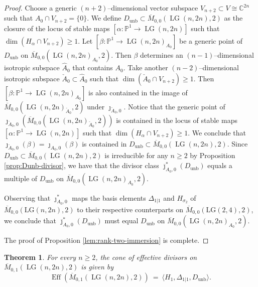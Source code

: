 \documentclass[10pt]{amsart}
\newtheorem{theorem}{Theorem}[section]
\theoremstyle{definition}
\newcommand{\Mbar}{\overline{M}}
\newcommand{\LG}{\operatorname{LG}}
\DeclareMathOperator{\unb}{unb}
\newcommand{\PP}{\mathbb{P}}
\theoremstyle{plain} %
\begin{document}
\begin{proof}
Choose a generic $(n+2)$--dimensional vector subspace $V_{n+2}\subset V\cong\mathbb C^{2n}$ such that $A_0\cap V_{n+2}=\{0\}$. We define \(D_{\mathrm{unb}} \subset \Mbar_{0,0}(\LG(n,2n),2)\) as the closure of the locus of stable maps \([\alpha \colon \PP^1 \to \LG(n,2n)]\) such that \(\dim(H_\alpha\cap V_{n+2})\geq1\). Let $[\beta \colon \PP^1 \to \LG(n,2n)_{A_0}]$ be a generic point of $D_{\unb}$ on $\overline{M}_{0,0}(\LG(n,2n)_{A_0},2)$. Then $\beta$ determines an $(n-1)$--dimensional  isotropic subspace $\widehat A_0$ that contains $A_0$. Take another $(n-2)$--dimensional  isotropic subspace $\check A_0\subset \widehat A_0$ such that $\dim (\check A_0\cap V_{n+2})\geq 1$. Then $[\beta \colon \PP^1 \to \LG(n,2n)_{A_0}]$ is also contained in the image of $\overline{M}_{0,0}(\LG(n,2n)_{\check A_0},2)$ under $\jmath_{\check A_0,0}$. Notice that the generic point of
$\jmath_{\check A_0,0}(\overline{M}_{0,0}(\LG(n,2n)_{\check A_0},2))$ is contained in the locus of stable maps \([\alpha \colon \PP^1 \to \LG(n,2n)]\) such that \(\dim(H_\alpha\cap V_{n+2})\geq1\). We conclude that $\jmath_{\check A_0,0}(\beta)=\jmath_{A_0,0}(\beta)$ is contained in \(D_{\mathrm{unb}} \subset \Mbar_{0,0}(\LG(n,2n),2)\). Since \(D_{\unb}\subset \overline{M}_{0,0}(\LG(n,2n),2)\) is irreducible for any $n\geq2$ by Proposition \ref{prop:Dunb-divisor}, we have that the divisor class
$\overline\jmath_{A_0,0}^*(D_{\unb})$ equals a multiple of $D_{\unb}$ on $\overline{M}_{0,0}(\LG(n,2n)_{A_0},2)$.

Observing that $\jmath_{A_0,0}^*$ maps the basis elements $\Delta_{1|1}$ and $H_{\sigma_2}$ of $\overline{M}_{0,0}(\mathrm{LG}(n,2n),2)$ to their respective counterparts on $\overline{M}_{0,0}(\mathrm{LG}(2,4),2)$, we conclude that $\overline\jmath_{A_0,0}^*(D_{\unb})$ must equal $D_{\unb}$ on $\overline{M}_{0,0}(\LG(n,2n)_{A_0},2)$.

The proof of Proposition \ref{lem:rank-two-immersion} is complete. 
\end{proof}




\begin{theorem}\label{thm:Eff-general-n-k1}
For every $n\ge 2$, the cone of effective divisors on $\overline{M}_{0,1}(\LG(n,2n),2)$ is given by
\[
\operatorname{Eff}(\overline{M}_{0,1}(\LG(n,2n),2))\ =\ \bigl\langle H_1, \Delta_{1|1}, D_{\unb}\bigr\rangle.
\]
\end{theorem}
\end{document}
